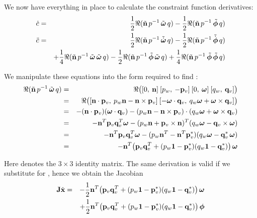 We now have everything in place to calculate the constraint function derivatives:
\begin{eqnarray}
\dot{c} & = & \label{constrJoystickC}
    \frac{1}{2} \Re(\tilde{\ve{n}}\, \q{p}^{-1}\, \tilde{\ve{\omega}}\,\q{q}) -
    \frac{1}{2} \Re(\tilde{\ve{n}}\, \q{p}^{-1}\, \tilde{\ve{\phi}}\, \q{q}) \\
\ddot{c} & = & \label{constrJoystickCDot}
    \frac{1}{2} \Re(\tilde{\ve{n}}\, \q{p}^{-1}\, \tilde{\dot{\ve{\omega}}}\,\q{q})
  - \frac{1}{2} \Re(\tilde{\ve{n}}\, \q{p}^{-1}\, \tilde{\dot{\ve{\phi}}}\, \q{q}) \\*
&&+ \frac{1}{4} \Re(\tilde{\ve{n}}\, \q{p}^{-1}\, \tilde{\ve{\omega}}\,\tilde{\ve{\omega}}\, \q{q})
  - \frac{1}{2} \Re(\tilde{\ve{n}}\, \q{p}^{-1}\, \tilde{\ve{\phi}}\,\tilde{\ve{\omega}}\, \q{q})
  + \frac{1}{4} \Re(\tilde{\ve{n}}\, \q{p}^{-1}\, \tilde{\ve{\phi}}\,\tilde{\ve{\phi}}\, \q{q})
    \nonumber
\end{eqnarray}

We manipulate these equations into the form required to find :
\begin{eqnarray*}
\Re(\tilde{\ve{n}}\, \q{p}^{-1}\, \tilde{\ve{\omega}}\,\q{q}) & = &
    \Re\big( [0,\:\ve{n}]\: [p_w,\:-\ve{p}_v]\: [0,\:\ve{\omega}]\: [q_w,\:\ve{q}_v] \big) \\*
&=& \Re\big( [\ve{n}\cdot\ve{p}_v,\: p_w\ve{n} - \ve{n}\times\ve{p}_v]\:
             [-\ve{\omega}\cdot\ve{q}_v,\: q_w\ve{\omega} + \ve{\omega}\times\ve{q}_v] \big) \\*
&=& -(\ve{n}\cdot\ve{p}_v) (\ve{\omega}\cdot\ve{q}_v) -
    ( p_w\ve{n} - \ve{n}\times\ve{p}_v ) \cdot ( q_w\ve{\omega} + \ve{\omega}\times\ve{q}_v ) \\*
&=& -\ve{n}^T \ve{p}_v \ve{q}_v^T \ve{\omega} - ( p_w\ve{n} + \ve{p}_v\times\ve{n} )^T
    ( q_w\ve{\omega} - \ve{q}_v\times\ve{\omega} ) \\*
&=& -\ve{n}^T \ve{p}_v \ve{q}_v^T \ve{\omega} - ( p_w\ve{n}^T - \ve{n}^T\dual{\ve{p}_v} )
    ( q_w\ve{\omega} - \dual{\ve{q}_v}\,\ve{\omega} ) \\*
&=& -\ve{n}^T \big( \ve{p}_v \ve{q}_v^T + ( p_w\m{1} - \dual{\ve{p}_v} )
    ( q_w\m{1} - \dual{\ve{q}_v} ) \big)\, \ve{\omega}
\end{eqnarray*}

Here  denotes the $3\times3$ identity matrix. The same derivation is valid if we substitute
\ve{\phi} for \ve{\omega}, hence we obtain the Jacobian
\begin{eqnarray}
\m{J}\dot{\ve{x}} & = & 
    -\frac{1}{2} \ve{n}^T \big( \ve{p}_v \ve{q}_v^T + ( p_w\m{1} - \dual{\ve{p}_v} )
    ( q_w\m{1} - \dual{\ve{q}_v} ) \big)\, \ve{\omega} \nonumber\\*
&&  +\frac{1}{2} \ve{n}^T \big( \ve{p}_v \ve{q}_v^T + ( p_w\m{1} - \dual{\ve{p}_v} )
    ( q_w\m{1} - \dual{\ve{q}_v} ) \big)\, \ve{\phi}
\end{eqnarray}

